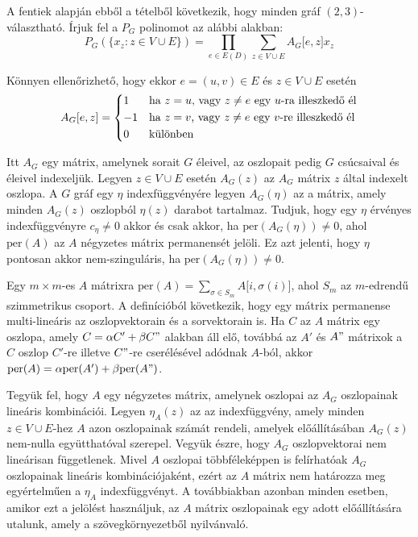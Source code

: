 \documentclass[12pt, a4paper]{report}
\theoremstyle{remark}
\theoremstyle{definition}
\begin{document}
A fentiek alapján ebből a tételből következik, hogy minden gráf $(2, 3)$-választható. Írjuk fel a $P_G$ polinomot az alábbi alakban:
\begin{equation}
P_G(\lbrace x_z: z \in V \cup E \rbrace) = \prod_{e \in E(D)} \sum_{z \in V \cup E} A_G \lbrack e, z \rbrack x_z
\end{equation}

Könnyen ellenőrizhető, hogy ekkor $e = (u, v) \in E$ és $z \in V \cup E$ esetén
\begin{equation}
A_G \lbrack e, z \rbrack = 
    \begin{dcases*}
    1 & ha $z = u$, vagy $z \neq e$ egy $u$-ra illeszkedő él\\
    -1 & ha $z = v$, vagy $z \neq e$ egy $v$-re illeszkedő él\\
    0 & különben
    \end{dcases*}
\end{equation}

Itt $A_G$ egy mátrix, amelynek sorait $G$ éleivel, az oszlopait pedig $G$ csúcsaival és éleivel indexeljük. Legyen $z \in V \cup E$ esetén $A_G(z)$ az $A_G$ mátrix $z$ által indexelt oszlopa. A $G$ gráf egy $\eta$ indexfüggvényére legyen $A_G(\eta)$ az a mátrix, amely minden $A_G(z)$ oszlopból $\eta(z)$ darabot tartalmaz. Tudjuk, hogy egy $\eta$ érvényes indexfüggvényre $c_{\eta} \neq 0$ akkor és csak akkor, ha $\mathrm{per}(A_G(\eta)) \neq 0$, ahol $\mathrm{per}(A)$ az $A$ négyzetes mátrix permanensét jelöli. Ez azt jelenti, hogy $\eta$ pontosan akkor nem-szinguláris, ha $\mathrm{per}(A_G(\eta)) \neq 0$.

Egy $m \times m$-es $A$ mátrixra $\mathrm{per}(A) = \sum\limits_{\sigma \in S_m} A \lbrack i, \sigma(i) \rbrack$, ahol $S_m$ az $m$-edrendű szimmetrikus csoport. A definícióból következik, hogy egy mátrix permanense multi-lineáris az oszlopvektorain és a sorvektorain is. Ha $C$ az $A$ mátrix egy oszlopa, amely $C = \alpha C' + \beta C"$ alakban áll elő, továbbá az $A'$ és $A"$ mátrixok a $C$ oszlop $C'$-re illetve $C"$-re cserélésével adódnak $A$-ból, akkor $\mathrm{per}(A) = \alpha \mathrm{per}(A') + \beta \mathrm{per}(A")$.

Tegyük fel, hogy $A$ egy négyzetes mátrix, amelynek oszlopai az $A_G$ oszlopainak lineáris kombinációi. Legyen $\eta_A(z)$ az az indexfüggvény, amely minden $z \in V \cup E$-hez $A$ azon oszlopainak számát rendeli, amelyek előállításában $A_G(z)$ nem-nulla együtthatóval szerepel. Vegyük észre, hogy $A_G$ oszlopvektorai nem lineárisan függetlenek. Mivel $A$ oszlopai többféleképpen is felírhatóak $A_G$ oszlopainak lineáris kombinációjaként, ezért az $A$ mátrix nem határozza meg egyértelműen a $\eta_A$ indexfüggvényt. A továbbiakban azonban minden esetben, amikor ezt a jelölést használjuk, az $A$ mátrix oszlopainak egy adott előállítására utalunk, amely a szövegkörnyezetből nyilvánvaló.
\end{document}
